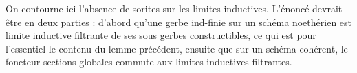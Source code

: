\documentclass[10pt]{../fichiers-configuration-latex/smfart}
\begin{document}
\begin{remarque2} On contourne ici l'absence de sorites sur les limites inductives. L'énoncé devrait
être en deux parties : d'abord qu'une gerbe ind-finie sur un schéma noethérien est limite inductive
filtrante de ses sous gerbes constructibles, ce qui est pour l'essentiel le contenu du lemme
précédent, ensuite que sur un schéma cohérent, le foncteur sections globales commute aux limites
inductives filtrantes.\end{remarque2}



\ifx\danslelivre\undefined 
 
\end{document}
